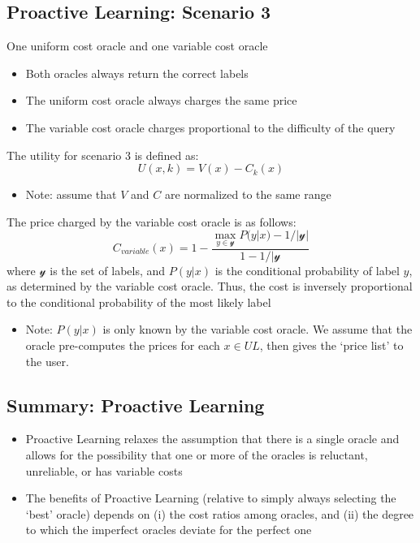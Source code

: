 \documentclass[10pt]{article}
\begin{document}
\subsection*{Proactive Learning: Scenario 3}
One uniform cost oracle and one variable cost oracle
\begin{itemize}
	\item Both oracles always return the correct labels
	\item The uniform cost oracle always charges the same price
	\item The variable cost oracle charges proportional to the difficulty of the query
\end{itemize}
The utility for scenario 3 is defined as:\[U(x, k) = V(x) - C_k(x)\]
\begin{itemize}
	\item Note: assume that $V$ and $C$ are normalized to the same range
\end{itemize}
The price charged by the variable cost oracle is as follows:
\[C_{variable}(x) = 1 - \frac{\max_{y \in \mathcal{y}} P(y | x) - 1 / |\mathcal{y}|}{1 - 1 / |\mathcal{y}}\]
where $\mathcal{y}$ is the set of labels, and $P(y | x)$ is the conditional probability of label $y$, as determined by the variable cost oracle.  Thus, the cost is inversely proportional to the conditional probability of the most likely label
\begin{itemize}
	\item Note: $P(y | x)$ is only known by the variable cost oracle.  We assume that the oracle pre-computes the prices for each $x \in UL$, then gives the `price list' to the user.
\end{itemize}

\subsection*{Summary: Proactive Learning}
\begin{itemize}
	\item Proactive Learning relaxes the assumption that there is a single oracle and allows for the possibility that one or more of the oracles is reluctant, unreliable, or has variable costs
	\item The benefits of Proactive Learning (relative to simply always selecting the `best' oracle) depends on (i) the cost ratios among oracles, and (ii) the degree to which the imperfect oracles deviate for the perfect one
\end{itemize}
\end{document}
